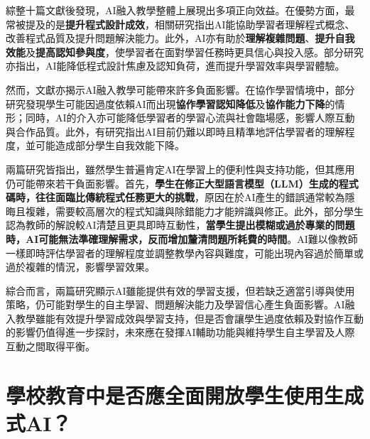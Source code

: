 綜整十篇文獻後發現，AI融入教學整體上展現出多項正向效益。在優勢方面，最常被提及的是\textbf{提升程式設計成效}，相關研究指出AI能協助學習者理解程式概念、改善程式品質及提升問題解決能力\cite{fan2025pair,groothuijsen2024chatbots,llerena2024introductory,omeh2025pbl,kohen2025integrating,tang2025enhancing}。此外，AI亦有助於\textbf{理解複雜問題}\cite{cao2023chatbots,groothuijsen2024chatbots,llerena2024introductory,tang2025enhancing}、\textbf{提升自我效能}\cite{yan2025llm,tang2025enhancing,cubillos2025generative}及\textbf{提高認知參與度}\cite{cao2023chatbots,kohen2025integrating}，使學習者在面對學習任務時更具信心與投入感。部分研究亦指出，AI能降低程式設計焦慮\cite{fan2025pair}及認知負荷\cite{yan2025llm}，進而提升學習效率與學習體驗。

然而，文獻亦揭示AI融入教學可能帶來許多負面影響。在協作學習情境中，部分研究發現學生可能因過度依賴AI而出現\textbf{協作學習認知降低}\cite{fan2025pair,groothuijsen2024chatbots}及\textbf{協作能力下降}\cite{groothuijsen2024chatbots}的情形；同時，AI的介入亦可能降低學習者的學習心流\cite{yang2025chatgpt}與社會臨場感\cite{fan2025pair}，影響人際互動與合作品質。此外，有研究指出AI目前仍難以即時且精準地評估學習者的理解程度\cite{yang2025chatgpt}，並可能造成部分學生自我效能下降\cite{yang2025chatgpt}。

\cite{kohen2025integrating,yang2025chatgpt}兩篇研究皆指出，雖然學生普遍肯定AI在學習上的便利性與支持功能，但其應用仍可能帶來若干負面影響。首先，\textbf{學生在修正大型語言模型（LLM）生成的程式碼時，往往面臨比傳統程式任務更大的挑戰}，原因在於AI產生的錯誤通常較為隱晦且複雜，需要較高層次的程式知識與除錯能力才能辨識與修正。此外，部分學生認為教師的解說較AI清楚且更具即時互動性，\textbf{當學生提出模糊或過於專業的問題時，AI可能無法準確理解需求，反而增加釐清問題所耗費的時間}。AI難以像教師一樣即時評估學習者的理解程度並調整教學內容與難度，可能出現內容過於簡單或過於複雜的情況，影響學習效果\cite{yang2025chatgpt}。

綜合而言，兩篇研究顯示AI雖能提供有效的學習支援，但若缺乏適當引導與使用策略，仍可能對學生的自主學習、問題解決能力及學習信心產生負面影響\cite{kohen2025integrating,yang2025chatgpt}。AI融入教學雖能有效提升學習成效與學習支持，但是否會讓學生過度依賴及對協作互動的影響仍值得進一步探討，未來應在發揮AI輔助功能與維持學生自主學習及人際互動之間取得平衡。

\section{學校教育中是否應全面開放學生使用生成式AI？}\label{sec:學校教育中是否應全面開放學生使用生成式AI？}

